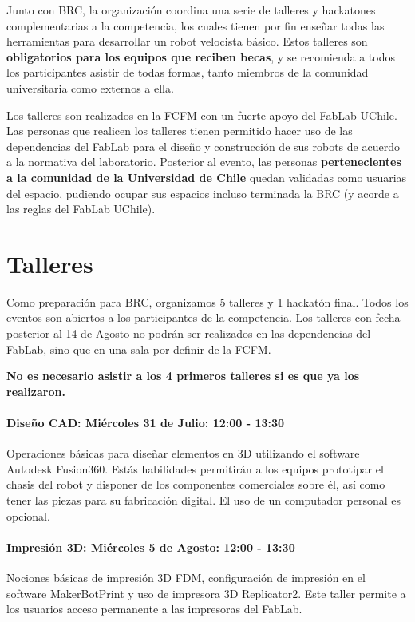 Junto con BRC, la organización coordina una serie de talleres y hackatones complementarias a la competencia, los cuales tienen por fin enseñar todas las herramientas para desarrollar un robot velocista básico. Estos talleres son \textbf{obligatorios para los equipos que reciben becas}, y se recomienda a todos los participantes asistir de todas formas, tanto miembros de la comunidad universitaria como externos a ella. 

Los talleres son realizados en la FCFM con un fuerte apoyo del FabLab UChile. 
Las personas que realicen los talleres tienen permitido hacer uso de las dependencias del FabLab para el diseño y construcción de sus robots de acuerdo a la normativa del laboratorio.
Posterior al evento, las personas \textbf{pertenecientes a la comunidad de la Universidad de Chile} quedan validadas como usuarias del espacio, pudiendo ocupar sus espacios incluso terminada la BRC (y acorde a las reglas del FabLab UChile).

\section{Talleres}

Como preparación para BRC, organizamos 5 talleres y 1 hackatón final.
Todos los eventos son abiertos a los participantes de la competencia.
Los talleres con fecha posterior al 14 de Agosto no podrán ser realizados en las dependencias del FabLab, sino que en una sala por definir de la FCFM.

\textbf{No es necesario asistir a los 4 primeros talleres si es que ya los realizaron.}

\paragraph*{Diseño CAD: Miércoles 31 de Julio: 12:00 - 13:30}
Operaciones básicas para diseñar elementos en 3D utilizando el software Autodesk Fusion360.
Estás habilidades permitirán a los equipos prototipar el chasis del robot y disponer de los componentes comerciales sobre él, así como tener las piezas para su fabricación digital.
El uso de un computador personal es opcional.

\paragraph*{Impresión 3D: Miércoles 5 de Agosto: 12:00 - 13:30}
Nociones básicas de impresión 3D FDM, configuración de impresión en el software MakerBotPrint y uso de impresora 3D Replicator2.
Este taller permite a los usuarios acceso permanente a las impresoras del FabLab.

